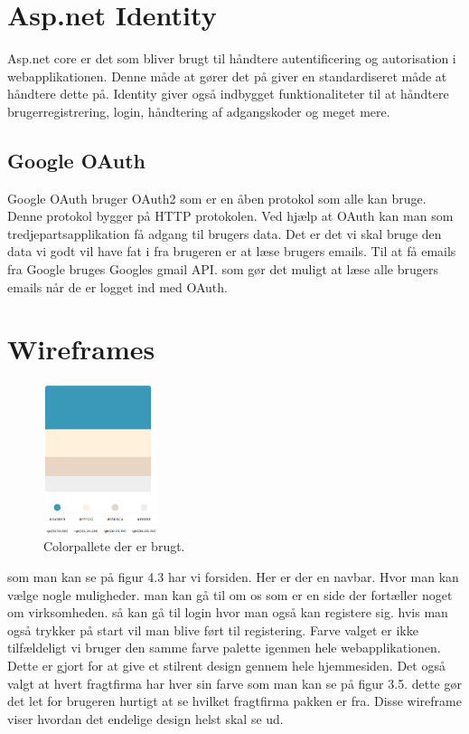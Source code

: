 \bigbreak


\section{Asp.net Identity}
Asp.net core er det som bliver brugt til håndtere autentificering og autorisation i webapplikationen.
Denne måde at gører det på giver en standardiseret måde at håndtere dette på. Identity giver også indbygget
funktionaliteter til at håndtere brugerregistrering, login, håndtering af adgangskoder og meget mere.

\subsection{Google OAuth}
Google OAuth bruger OAuth2 som er en åben protokol som alle kan bruge. Denne protokol bygger på
HTTP protokolen. Ved hjælp at OAuth kan man som tredjepartsapplikation få adgang til brugers data.
Det er det vi skal bruge den data vi godt vil have fat i fra brugeren er at læse brugers emails. 
Til at få emails fra Google bruges Googles gmail API. som gør det muligt at læse alle brugers emails når de
er logget ind med OAuth.
\newpage
\section{Wireframes}

\begin{figure} 
    \includegraphics[width=0.3\textwidth]{./Pictures/Colorpallete.png}
    \caption{Colorpallete der er brugt.}
    \label{fig:Colorpallete}
\end{figure}

som man kan se på figur 4.3 har vi forsiden. Her er der en navbar. Hvor man kan vælge nogle muligheder. man
kan gå til om os som er en side der fortæller noget om virksomheden. så kan gå til login hvor man også kan registere sig.
hvis man også trykker på start vil man blive ført til registering. Farve valget er ikke tilfældeligt vi bruger den samme farve
palette igenmen hele webapplikationen. Dette er gjort for at give et stilrent design gennem hele hjemmesiden. Det også valgt at hvert
fragtfirma har hver sin farve som man kan se på figur 3.5. dette gør det let for brugeren hurtigt at se hvilket fragtfirma pakken er fra.
Disse wireframe viser hvordan det endelige design helst skal se ud.

